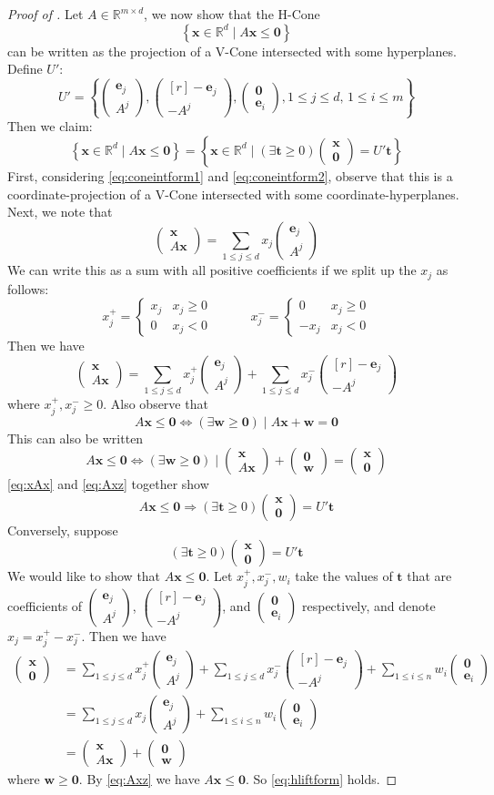 \documentclass[fleqn]{article}
\renewcommand{\vec}[1]{\mathbf{#1}}
\newcommand{\set}[1]{\left\{#1\right\}}
\newcommand{\R}{\mathbb{R}}
\newcommand{\0}{\vec{0}}
\newcommand{\x}{\vec{x}}
\newcommand{\e}{\vec{e}}
\newcommand{\w}{\vec{w}}
\renewcommand{\t}{\vec{t}}
\newcommand{\st}{\;|\;}
\newcommand{\St}{\;\Big|\;}
\newcommand{\Adim}{m}
\newcommand{\mspaceA}{\R^{{\Adim}\times d}}
\newcommand{\xv}{\x \in \R^d}
\newcommand{\mA}{A \in \mspaceA}
\newcommand{\xAx}{\begin{pmatrix*}\x\\ A\x\end{pmatrix*}}
\newcommand{\xz}{\begin{pmatrix*}\x\\ \0\end{pmatrix*}}
\newcommand{\zw}{\begin{pmatrix*}\0\\ \w\end{pmatrix*}}
\newcommand{\eAj}{\begin{pmatrix*}\e_j\\ A^j\end{pmatrix*}}
\newcommand{\neAj}{\begin{pmatrix*}[r]-\e_j\\ -A^j\end{pmatrix*}}
\newcommand{\zei}{\begin{pmatrix*} \0 \\ \e_i \end{pmatrix*}}
\newcommand{\xjp}{x_j^+}
\newcommand{\xjm}{x_j^-}
\newcommand{\jsum}{\sum_{1\leq j \leq d}}
\newcommand{\isum}{\sum_{1\leq i \leq n}}
\begin{document}
\begin{proof}[Proof of {\Hlift}]
Let $\mA$, we now show that the H-Cone 
  \[\set{\xv \st A\x \leq \0}\]
can be written as the projection of a V-Cone intersected with some hyperplanes.  Define $U'$:
  \[ U' = \set{\eAj, \neAj, \zei, 1 \leq j \leq d,\, 1 \leq i \leq m} \]
  Then we claim:
\begin{equation}\label{eq:hliftform}
   \set{\xv \st A\x \leq \0} = \set{\xv \St (\exists \t \geq 0) \xz = U'\t}
\end{equation}
  First, considering \eqref{eq:coneintform1} and \eqref{eq:coneintform2}, observe that this is a coordinate-projection of a V-Cone intersected with some coordinate-hyperplanes.
Next, we note that
  \[ \xAx = \jsum x_j \eAj \]
We can write this as a sum with all positive coefficients if we split up the $x_j$ as follows:
\[
   \xjp = \begin{cases} x_j & x_j \geq 0 \\ 0 & x_j < 0 \end{cases} \quad\quad\quad
   \xjm = \begin{cases} 0 & x_j \geq 0 \\ -x_j & x_j < 0 \end{cases}
\]
Then we have
\begin{equation} \label{eq:xAx}
  \xAx = \jsum \xjp \eAj + \jsum \xjm \neAj
\end{equation}
where $\xjp, \xjm \geq 0$.  Also observe that
  \[ A\x \leq \0 \Leftrightarrow (\exists \w \geq \0) \st A\x + \w = \0 \]
This can also be written
\begin{equation} \label{eq:Axz}
  A\x \leq \0 \Leftrightarrow (\exists \w \geq \0) \st \xAx + \zw = \xz
\end{equation}
\eqref{eq:xAx} and \eqref{eq:Axz} together show
\[ A\x \leq \0 \Rightarrow (\exists \t \geq 0) \xz = U'\t \]
Conversely, suppose
\[ (\exists \t \geq 0) \xz = U'\t \]
We would like to show that $A\x \leq \0$.  Let $\xjp,\xjm,w_i$ take the values of $\t$ that are coefficients of $\eAj$, $\neAj$, and $\zei$ respectively, and denote $x_j = \xjp - \xjm$.  Then we have
\begin{align*} 
\xz &= \jsum \xjp \eAj + \jsum \xjm \neAj + \isum w_i\zei\\
    &= \jsum x_j \eAj + \isum w_i\zei \\
    &= \xAx + \zw
\end{align*}
where $\w \geq \0$.  By \eqref{eq:Axz} we have $A\x \leq \0$.  So \eqref{eq:hliftform} holds.
\end{proof}
\end{document}
